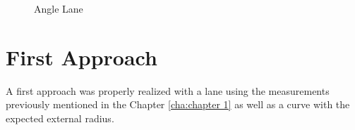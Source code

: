     \begin{figure}[h]
    \centering
    \caption{Angle Lane} \label{fig:AngleLane}
    \end{figure}

\section{First Approach}
A first approach was properly realized with a lane using the measurements previously mentioned in the Chapter \ref{cha:chapter 1} as well as a curve with the expected external radius. 
